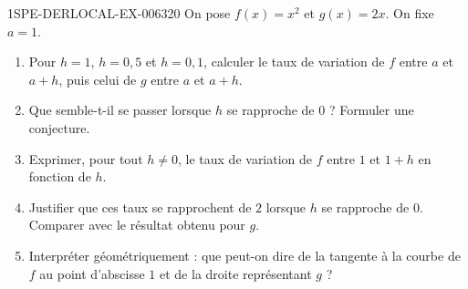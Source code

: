 \begin{exercice}{1SPE-DERLOCAL-EX-006}{3}{20}
On pose $f(x)=x^2$ et $g(x)=2x$. On fixe $a=1$.

\begin{enumerate}
  \item Pour $h=1$, $h=0{,}5$ et $h=0{,}1$, calculer le taux de variation de $f$ entre $a$ et $a+h$, puis celui de $g$ entre $a$ et $a+h$.
  \item Que semble-t-il se passer lorsque $h$ se rapproche de $0$ ? Formuler une conjecture.
  \item Exprimer, pour tout $h\ne 0$, le taux de variation de $f$ entre $1$ et $1+h$ en fonction de $h$.
  \item Justifier que ces taux se rapprochent de $2$ lorsque $h$ se rapproche de $0$. Comparer avec le résultat obtenu pour $g$.
  \item Interpréter géométriquement : que peut-on dire de la tangente à la courbe de $f$ au point d'abscisse $1$ et de la droite représentant $g$ ?
\end{enumerate}
\end{exercice}
